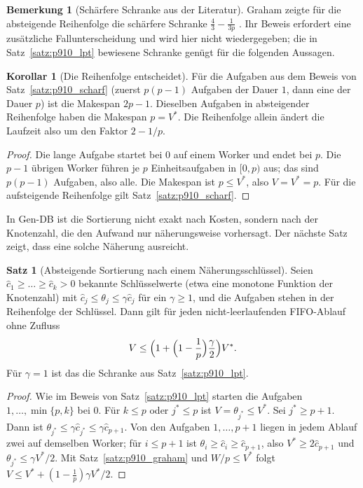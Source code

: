 \documentclass[a4paper,12pt, twoside]{report}
\theoremstyle{definition}
\newtheorem{satz}{Satz}
\newtheorem{bemerkung}{Bemerkung}
\newtheorem{korollar}{Korollar}
\begin{document}
\begin{bemerkung}[Schärfere Schranke aus der Literatur]
\label{bem:p910_lpt43}
Graham zeigte für die absteigende Reihenfolge die schärfere Schranke $\tfrac43-\tfrac1{3p}$ \cite{graham1969}. Ihr Beweis erfordert eine zusätzliche Fallunterscheidung und wird hier nicht wiedergegeben; die in Satz~\ref{satz:p910_lpt} bewiesene Schranke genügt für die folgenden Aussagen.
\end{bemerkung}

\begin{korollar}[Die Reihenfolge entscheidet]
\label{kor:p910_reihenfolge}
Für die Aufgaben aus dem Beweis von Satz~\ref{satz:p910_scharf} (zuerst $p(p-1)$ Aufgaben der Dauer $1$, dann eine der Dauer $p$) ist die Makespan $2p-1$. Dieselben Aufgaben in absteigender Reihenfolge haben die Makespan $p=V^\ast$. Die Reihenfolge allein ändert die Laufzeit also um den Faktor $2-1/p$.
\end{korollar}

\begin{proof}
Die lange Aufgabe startet bei $0$ auf einem Worker und endet bei $p$. Die $p-1$ übrigen Worker führen je $p$ Einheitsaufgaben in $[0,p)$ aus; das sind $p(p-1)$ Aufgaben, also alle. Die Makespan ist $p\le V^\ast$, also $V=V^\ast=p$. Für die aufsteigende Reihenfolge gilt Satz~\ref{satz:p910_scharf}.
\end{proof}

In Gen-DB ist die Sortierung nicht exakt nach Kosten, sondern nach der Knotenzahl, die den Aufwand nur näherungsweise vorhersagt. Der nächste Satz zeigt, dass eine solche Näherung ausreicht.

\begin{satz}[Absteigende Sortierung nach einem Näherungsschlüssel]
\label{satz:p910_gamma}
Seien $\hat c_1\ge\dots\ge\hat c_k>0$ bekannte Schlüsselwerte (etwa eine monotone Funktion der Knotenzahl) mit $\hat c_j\le\theta_j\le\gamma\hat c_j$ für ein $\gamma\ge 1$, und die Aufgaben stehen in der Reihenfolge der Schlüssel. Dann gilt für jeden nicht-leerlaufenden FIFO-Ablauf ohne Zufluss
\[
V\le\Bigl(1+\Bigl(1-\frac1p\Bigr)\frac\gamma2\Bigr)V^\ast .
\]
Für $\gamma=1$ ist das die Schranke aus Satz~\ref{satz:p910_lpt}.
\end{satz}

\begin{proof}
Wie im Beweis von Satz~\ref{satz:p910_lpt} starten die Aufgaben $1,\dots,\min\{p,k\}$ bei $0$. Für $k\le p$ oder $j^\ast\le p$ ist $V=\theta_{j^\ast}\le V^\ast$. Sei $j^\ast\ge p+1$. Dann ist $\theta_{j^\ast}\le\gamma\hat c_{j^\ast}\le\gamma\hat c_{p+1}$. Von den Aufgaben $1,\dots,p+1$ liegen in jedem Ablauf zwei auf demselben Worker; für $i\le p+1$ ist $\theta_i\ge\hat c_i\ge\hat c_{p+1}$, also $V^\ast\ge 2\hat c_{p+1}$ und $\theta_{j^\ast}\le\gamma V^\ast/2$. Mit Satz~\ref{satz:p910_graham} und $W/p\le V^\ast$ folgt $V\le V^\ast+(1-\frac1p)\gamma V^\ast/2$.
\end{proof}
\end{document}
